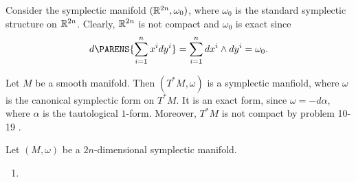 \begin{example}
	Consider the symplectic manifold $(\mathbb{R}^{2n},\omega_0)$, where $\omega_0$ is the standard symplectic structure on $\mathbb{R}^{2n}$. Clearly, $\mathbb{R}^{2n}$ is not compact and $\omega_0$ is exact since
	\begin{equation*}
		d \PARENS{\sum_{i = 1}^n x^i dy^i} = \sum_{i = 1}^n dx^i \wedge dy^i = \omega_0.
	\end{equation*}
\end{example}

\begin{example}
	Let $M$ be a smooth manifold. Then $(T^*M, \omega)$ is a symplectic manfiold, where $\omega$ is the canonical symplectic form on $T^*M$. It is an exact form, since $\omega = - d\alpha$, where $\alpha$ is the tautological $1$-form. Moreover, $T^*M$ is not compact by problem 10-19 \cite[271]{lee:smooth_manifolds:2013}.	
\end{example}

\begin{exercise}
Let $(M,\omega)$ be a $2n$-dimensional symplectic manifold. 
\begin{enumerate}[label = \textup{(}\alph*\textup{)}]
\item 
\end{enumerate}
\end{exercise}


